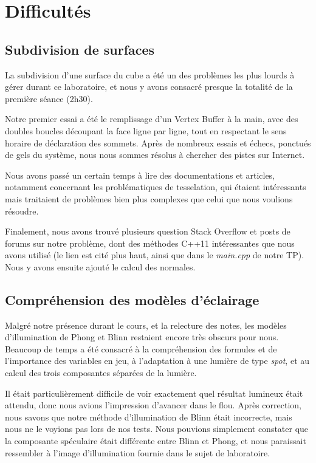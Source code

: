 \documentclass[10pt,a4paper]{article}
\begin{document}
\section{Difficultés}

\subsection{Subdivision de surfaces}

La subdivision d'une surface du cube a été un des problèmes les plus lourds à gérer durant ce laboratoire, et nous y avons consacré presque la totalité de la première séance (2h30).

Notre premier essai a été le remplissage d'un Vertex Buffer à la main, avec des doubles boucles découpant la face ligne par ligne, tout en respectant le sens horaire de déclaration des sommets. Après de nombreux essais et échecs, ponctués de gels du système, nous nous sommes résolus à chercher des pistes sur Internet.

Nous avons passé un certain temps à lire des documentations et articles, notamment concernant les problématiques de tesselation, qui étaient intéressants mais traitaient de problèmes bien plus complexes que celui que nous voulions résoudre.

Finalement, nous avons trouvé plusieurs question Stack Overflow et posts de forums sur notre problème, dont des méthodes C++11 intéressantes que nous avons utilisé (le lien est cité plus haut, ainsi que dans le \textit{main.cpp} de notre TP). Nous y avons ensuite ajouté le calcul des normales.

\subsection{Compréhension des modèles d'éclairage}

Malgré notre présence durant le cours, et la relecture des notes, les modèles d'illumination de Phong et Blinn restaient encore très obscurs pour nous. Beaucoup de temps a été consacré à la compréhension des formules et de l'importance des variables en jeu, à l'adaptation à une lumière de type \textit{spot}, et au calcul des trois composantes séparées de la lumière.

Il était particulièrement difficile de voir exactement quel résultat lumineux était attendu, donc nous avions l'impression d'avancer dans le flou. Après correction, nous savons que notre méthode d'illumination de Blinn était incorrecte, mais nous ne le voyions pas lors de nos tests. Nous pouvions simplement constater que la composante spéculaire était différente entre Blinn et Phong, et nous paraissait ressembler à l'image d'illumination fournie dans le sujet de laboratoire.
\end{document}
